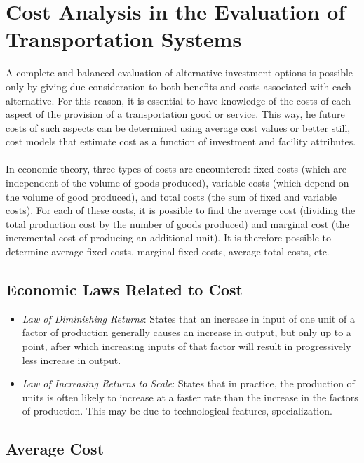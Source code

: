 \section{Cost Analysis in the Evaluation of Transportation Systems}
A complete and balanced evaluation of alternative investment options is possible only by giving due consideration to both benefits and costs associated with each alternative. For this reason, it is essential to have knowledge of the costs of each aspect of the provision of a transportation good or service. This way, he future costs of such aspects can be determined using average cost values or better still, cost models that estimate cost as a function of investment and facility attributes.
\paragraph{}
In economic theory, three types of costs are encountered: fixed costs (which are independent of the volume of goods produced), variable costs (which depend on the volume of good produced), and total costs (the sum of fixed and variable costs). For each of these costs, it is possible to find the average cost (dividing the total production cost by the number of goods produced) and marginal cost (the incremental cost of producing an additional unit). It is therefore possible to determine average fixed costs, marginal fixed costs, average total costs, etc.
\subsection{Economic Laws Related to Cost}
\begin{itemize}
	\item \textit{Law of Diminishing Returns}: States that an increase in input of one unit of a factor of production generally causes an increase in output, but only up to a point, after which increasing inputs of that factor will result in progressively less increase in output.
	\item \textit{Law of Increasing Returns to Scale}: States that in practice, the production of units is often likely to increase at a faster rate than the increase in the factors of production. This may be due to technological features, specialization.
\end{itemize}
\subsection{Average Cost}

